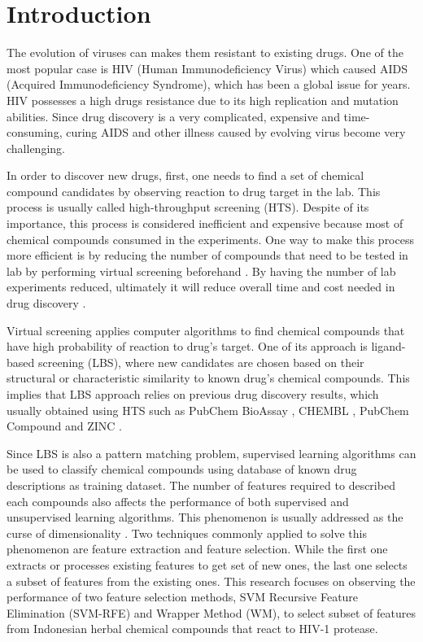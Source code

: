 \documentclass[conference,compsoc,12pt]{IEEEtran}
\begin{document}
\IEEEpeerreviewmaketitle

\section{Introduction}

The evolution of viruses can makes them resistant to existing drugs. One of the most popular case is HIV (Human Immunodeficiency Virus) which caused AIDS (Acquired Immunodeficiency Syndrome), which has been a global issue for years. HIV possesses a high drugs resistance due to its high replication and mutation abilities. Since drug discovery is a very complicated, expensive and time-consuming, curing AIDS and other illness caused by evolving virus become very challenging\cite{yanuar2014virtual}.

In order to discover new drugs, first, one needs to find a set of chemical compound candidates by observing reaction to drug target in the lab. This process is usually called high-throughput screening (HTS). Despite of its importance, this process is considered inefficient and expensive because most of chemical compounds consumed in the experiments. One way to make this process more efficient is by reducing the number of compounds that need to be tested in lab by performing virtual screening beforehand \cite{chen2017developing}. By having the number of lab experiments reduced, ultimately it will reduce overall time and cost needed in drug discovery \cite{korkmaz2014drug}.

Virtual screening applies computer algorithms to find chemical compounds that have high probability of reaction to drug's target. One of its approach is ligand-based screening (LBS), where new candidates are chosen based on their structural or characteristic similarity to known drug's chemical compounds. This implies that LBS approach relies on previous drug discovery results, which usually obtained using HTS such as PubChem BioAssay \cite{bioassay2014update}, CHEMBL \cite{bento2014chembl}, PubChem Compound \cite{kim2015pubchem} and ZINC \cite{irwin2012zinc}.

Since LBS is also a pattern matching problem, supervised learning algorithms can be used to classify chemical compounds using database of known drug descriptions as training dataset. The number of features required to described each compounds also affects the performance of both supervised and unsupervised learning algorithms. This phenomenon is usually addressed as the curse of dimensionality \cite{janecek2008relationship}. Two techniques commonly applied to solve this phenomenon are feature extraction and feature selection. While the first one extracts or processes existing features to get set of new ones, the last one selects a subset of features from the existing ones. This research focuses on observing the performance of two feature selection methods, SVM Recursive Feature Elimination (SVM-RFE) and Wrapper Method (WM), to select subset of features from Indonesian herbal chemical compounds that react to HIV-1 protease.
\end{document}
